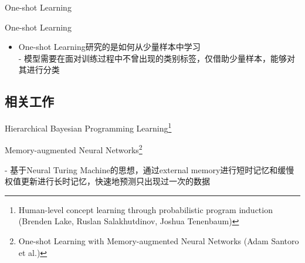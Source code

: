 \documentclass[10pt]{beamer}
\begin{document}
\begin{frame}{One-shot Learning}
\begin{block}{One-shot Learning}
\begin{itemize}
	\item One-shot Learning研究的是如何从少量样本中学习\\
	 - 模型需要在面对训练过程中不曾出现的类别标签，仅借助少量样本，能够对其进行分类
\end{itemize}

\end{block}


\end{frame}

\subsection{相关工作}



\begin{frame}{Hierarchical Bayesian Programming Learning\footnote{Human-level concept learning through probabilistic program induction (Brenden Lake, Ruslan Salakhutdinov, Joshua Tenenbaum)}}

\end{frame}




\begin{frame}{Memory-augmented Neural Networks\footnote{One-shot Learning with Memory-augmented Neural Networks (Adam Santoro et al.)}}
\begin{block}{}
- 基于Neural Turing Machine的思想，通过external memory进行短时记忆和缓慢权值更新进行长时记忆，快速地预测只出现过一次的数据
\end{block}

\end{frame}



\end{document}
